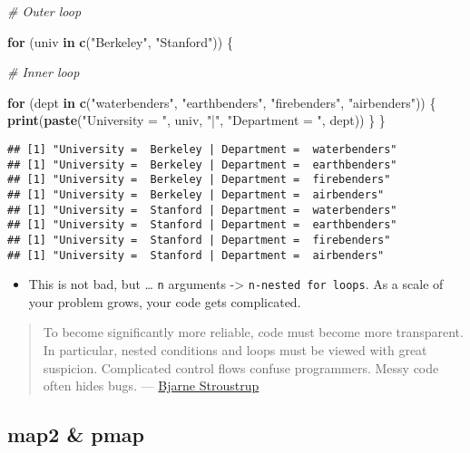 \documentclass[
]{book}
\newenvironment{Shaded}{\begin{snugshade}}{\end{snugshade}}
\newcommand{\CommentTok}[1]{\textcolor[rgb]{0.56,0.35,0.01}{\textit{#1}}}
\newcommand{\ControlFlowTok}[1]{\textcolor[rgb]{0.13,0.29,0.53}{\textbf{#1}}}
\newcommand{\KeywordTok}[1]{\textcolor[rgb]{0.13,0.29,0.53}{\textbf{#1}}}
\newcommand{\NormalTok}[1]{#1}
\newcommand{\StringTok}[1]{\textcolor[rgb]{0.31,0.60,0.02}{#1}}
\providecommand{\tightlist}{%
  \setlength{\itemsep}{0pt}\setlength{\parskip}{0pt}}
\begin{document}
\begin{Shaded}
\begin{Highlighting}[]
\CommentTok{\# Outer loop}

\ControlFlowTok{for}\NormalTok{ (univ }\ControlFlowTok{in} \KeywordTok{c}\NormalTok{(}\StringTok{"Berkeley"}\NormalTok{, }\StringTok{"Stanford"}\NormalTok{)) \{}

  \CommentTok{\# Inner loop}

  \ControlFlowTok{for}\NormalTok{ (dept }\ControlFlowTok{in} \KeywordTok{c}\NormalTok{(}\StringTok{"waterbenders"}\NormalTok{, }\StringTok{"earthbenders"}\NormalTok{, }\StringTok{"firebenders"}\NormalTok{, }\StringTok{"airbenders"}\NormalTok{)) \{}
    \KeywordTok{print}\NormalTok{(}\KeywordTok{paste}\NormalTok{(}\StringTok{"University = "}\NormalTok{, univ, }\StringTok{"|"}\NormalTok{, }\StringTok{"Department = "}\NormalTok{, dept))}
\NormalTok{  \}}
\NormalTok{\}}
\end{Highlighting}
\end{Shaded}

\begin{verbatim}
## [1] "University =  Berkeley | Department =  waterbenders"
## [1] "University =  Berkeley | Department =  earthbenders"
## [1] "University =  Berkeley | Department =  firebenders"
## [1] "University =  Berkeley | Department =  airbenders"
## [1] "University =  Stanford | Department =  waterbenders"
## [1] "University =  Stanford | Department =  earthbenders"
## [1] "University =  Stanford | Department =  firebenders"
## [1] "University =  Stanford | Department =  airbenders"
\end{verbatim}

\begin{itemize}
\tightlist
\item
  This is not bad, but \ldots{} \texttt{n} arguments -\textgreater{} \texttt{n-nested\ for\ loops}. As a scale of your problem grows, your code gets complicated.
\end{itemize}

\begin{quote}
To become significantly more reliable, code must become more transparent. In particular, nested conditions and loops must be viewed with great suspicion. Complicated control flows confuse programmers. Messy code often hides bugs. --- \href{https://en.wikipedia.org/wiki/Bjarne_Stroustrup}{Bjarne Stroustrup}
\end{quote}

\hypertarget{map2-pmap}{%
\subsection{map2 \& pmap}\label{map2-pmap}}
\end{document}
